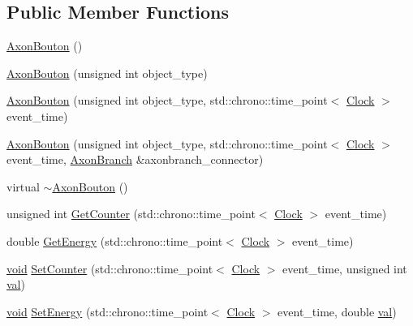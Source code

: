 \subsection*{Public Member Functions}
\begin{DoxyCompactItemize}
\item 
\mbox{\hyperlink{class_axon_bouton_acd6521d65ecb2b86abf2e3a8b322699e}{Axon\+Bouton}} ()
\item 
\mbox{\hyperlink{class_axon_bouton_a8a2da76b259a5ebab397fbd89d8b0632}{Axon\+Bouton}} (unsigned int object\+\_\+type)
\item 
\mbox{\hyperlink{class_axon_bouton_a93e33d72d90801d29d2b16ef94b59fab}{Axon\+Bouton}} (unsigned int object\+\_\+type, std\+::chrono\+::time\+\_\+point$<$ \mbox{\hyperlink{universe_8h_a0ef8d951d1ca5ab3cfaf7ab4c7a6fd80}{Clock}} $>$ event\+\_\+time)
\item 
\mbox{\hyperlink{class_axon_bouton_a6d671fc3b6bd8e617085c1bc7212400d}{Axon\+Bouton}} (unsigned int object\+\_\+type, std\+::chrono\+::time\+\_\+point$<$ \mbox{\hyperlink{universe_8h_a0ef8d951d1ca5ab3cfaf7ab4c7a6fd80}{Clock}} $>$ event\+\_\+time, \mbox{\hyperlink{class_axon_branch}{Axon\+Branch}} \&axonbranch\+\_\+connector)
\item 
virtual \mbox{\hyperlink{class_axon_bouton_ab6f93f680d19d4f07476d1d1b3de776a}{$\sim$\+Axon\+Bouton}} ()
\item 
unsigned int \mbox{\hyperlink{class_axon_bouton_a251fc23f754c077cf43ee68991b81624}{Get\+Counter}} (std\+::chrono\+::time\+\_\+point$<$ \mbox{\hyperlink{universe_8h_a0ef8d951d1ca5ab3cfaf7ab4c7a6fd80}{Clock}} $>$ event\+\_\+time)
\item 
double \mbox{\hyperlink{class_axon_bouton_a8dff077a40565f4e3a34388a6c38a603}{Get\+Energy}} (std\+::chrono\+::time\+\_\+point$<$ \mbox{\hyperlink{universe_8h_a0ef8d951d1ca5ab3cfaf7ab4c7a6fd80}{Clock}} $>$ event\+\_\+time)
\item 
\mbox{\hyperlink{glad_8h_a950fc91edb4504f62f1c577bf4727c29}{void}} \mbox{\hyperlink{class_axon_bouton_afe285478d414f2815afb98abe7b92898}{Set\+Counter}} (std\+::chrono\+::time\+\_\+point$<$ \mbox{\hyperlink{universe_8h_a0ef8d951d1ca5ab3cfaf7ab4c7a6fd80}{Clock}} $>$ event\+\_\+time, unsigned int \mbox{\hyperlink{glad_8h_a26942fd2ed566ef553eae82d2c109c8f}{val}})
\item 
\mbox{\hyperlink{glad_8h_a950fc91edb4504f62f1c577bf4727c29}{void}} \mbox{\hyperlink{class_axon_bouton_ab24fa467ab7221d0577e54734684a491}{Set\+Energy}} (std\+::chrono\+::time\+\_\+point$<$ \mbox{\hyperlink{universe_8h_a0ef8d951d1ca5ab3cfaf7ab4c7a6fd80}{Clock}} $>$ event\+\_\+time, double \mbox{\hyperlink{glad_8h_a26942fd2ed566ef553eae82d2c109c8f}{val}})

\end{DoxyCompactItemize}
